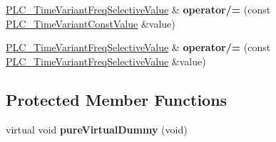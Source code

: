 \begin{DoxyCompactItemize}
\item 
\hypertarget{classns3_1_1PLC__TimeVariantFreqSelectiveValue_afed827478a8629ae36794aabfea3568f}{\hyperlink{classns3_1_1PLC__TimeVariantFreqSelectiveValue}{\-P\-L\-C\-\_\-\-Time\-Variant\-Freq\-Selective\-Value} \& {\bfseries operator/=} (const \hyperlink{classns3_1_1PLC__TimeVariantConstValue}{\-P\-L\-C\-\_\-\-Time\-Variant\-Const\-Value} \&value)}\label{classns3_1_1PLC__TimeVariantFreqSelectiveValue_afed827478a8629ae36794aabfea3568f}

\item 
\hypertarget{classns3_1_1PLC__TimeVariantFreqSelectiveValue_abb5b8bb1994e9df59b20baab5edd354d}{\hyperlink{classns3_1_1PLC__TimeVariantFreqSelectiveValue}{\-P\-L\-C\-\_\-\-Time\-Variant\-Freq\-Selective\-Value} \& {\bfseries operator/=} (const \hyperlink{classns3_1_1PLC__TimeVariantFreqSelectiveValue}{\-P\-L\-C\-\_\-\-Time\-Variant\-Freq\-Selective\-Value} \&value)}\label{classns3_1_1PLC__TimeVariantFreqSelectiveValue_abb5b8bb1994e9df59b20baab5edd354d}

\end{DoxyCompactItemize}
\subsection*{\-Protected \-Member \-Functions}
\begin{DoxyCompactItemize}
\item 
\hypertarget{classns3_1_1PLC__TimeVariantFreqSelectiveValue_ad56f5b35b9888cf9e7bada0725ef7a68}{virtual void {\bfseries pure\-Virtual\-Dummy} (void)}\label{classns3_1_1PLC__TimeVariantFreqSelectiveValue_ad56f5b35b9888cf9e7bada0725ef7a68}

\end{DoxyCompactItemize}
